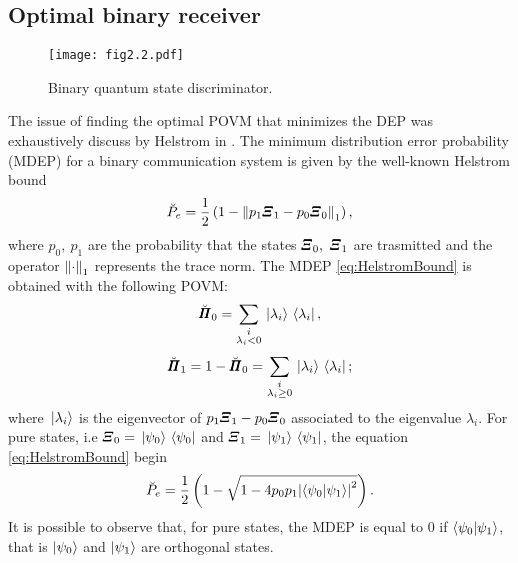     \subsection{Optimal binary receiver}
    \begin{figure}[t]
        \begin{center}
            \texttt{[image: fig2.2.pdf]}
            \caption{Binary quantum state discriminator.}
            \label{fig:2.2}
        \end{center}
    \end{figure}
    The issue of finding the optimal POVM that minimizes the DEP was exhaustively discuss  by Helstrom in 
    \cite{helstrom3,helstrom4}. The minimum distribution error probability (MDEP) for a binary 
    communication system is given by the well-known Helstrom bound
    \begin{equation}
        \breve{P}_e = \frac{1}{2} \left(1-\norm{p_1 \Operator{\varXi}_1 - p_0 \Operator{\varXi}_0}_1 \right),
        \label{eq:HelstromBound}
    \end{equation}
    where $p_0,\ p_1$ are the probability that the states $\Operator{\varXi}_0,\ \Operator{\varXi}_1$ are trasmitted
    and the operator $\norm{\cdot}_1$ represents the trace norm. 
    The MDEP \ref{eq:HelstromBound} is obtained with the following POVM:
    \begin{equation}
        \breve{\Operator{\varPi}}_0 = \sum_{\substack{i \\ \lambda_i<0}} \ket*{\lambda_i}\bra*{\lambda_i},
    \end{equation}
    \begin{equation*}
        \breve{\Operator{\varPi}}_1 = 1-\breve{\Operator{\varPi}}_0 = 
        \sum_{\substack{i \\ \lambda_i \geq 0}} \ket*{\lambda_i}\bra*{\lambda_i};
    \end{equation*}
    where $\ket*{\lambda_i}$ is the eigenvector of $p_1 \Operator{\varXi}_1 - p_0 \Operator{\varXi}_0$ associated to 
    the eigenvalue $\lambda_i$.
    For pure states, i.e $\Operator{\varXi}_0 = \ket*{\psi_0}\bra*{\psi_0}$ and $\Operator{\varXi}_1 = \ket*{\psi_1}
    \bra*{\psi_1}$, the equation \ref{eq:HelstromBound} begin
    \begin{equation}
        \breve{P}_e = \frac{1}{2} \left(1- \sqrt{1-4 p_0 p_1 \absolutevalue{\braket{\psi_0}{\psi_1}}^2}
        \right).
        \label{eq:HelstromBPure}
    \end{equation}
    It is possible to observe that, for pure states, the MDEP is equal to $0$ if $\braket{\psi_0}{\psi_1}$,
    that is $\ket{\psi_0}$ and $\ket{\psi_1}$ are orthogonal states.